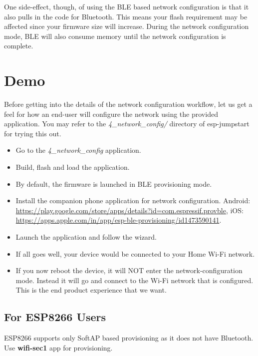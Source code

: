 \documentclass[main.tex]{subfiles}
\begin{document}
One side-effect, though, of using the BLE based network configuration is that it also pulls in the code for Bluetooth. This means your flash requirement may be affected since your firmware size will increase. During the network configuration mode, BLE will also consume memory until the network configuration is complete.


\section{Demo}
Before getting into the details of the network configuration workflow, let us get a feel for how an end-user will configure the network using the provided application.
You may refer to the \textit{4\_network\_config/} directory of esp-jumpstart for trying this out.

\begin{itemize}
    \item Go to the \textit{4\_network\_config} application.
    \item Build, flash and load the application.
    \item By default, the firmware is launched in BLE provisioning mode.
    \item Install the companion phone application for network configuration. Android: \url{https://play.google.com/store/apps/details?id=com.espressif.provble}, iOS: \url{https://apps.apple.com/in/app/esp-ble-provisioning/id1473590141}.
    \item Launch the application and follow the wizard.
\end{itemize}



\begin{itemize}
    \item If all goes well, your device would be connected to your Home Wi-Fi network.
    \item If you now reboot the device, it will NOT enter the network-configuration mode. Instead it will go and connect to the Wi-Fi network that is configured. This is the end product experience that we want.
\end{itemize}

\subsection{For ESP8266 Users}\label{sec:for_esp8266_users}
ESP8266 supports only SoftAP based provisioning as it does not have Bluetooth. Use \textbf{wifi-sec1} app for provisioning.
\end{document}
